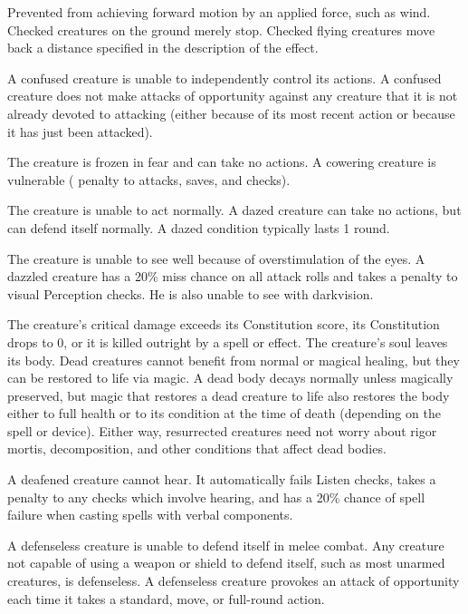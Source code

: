  Prevented from achieving forward motion by an applied force, such as wind. Checked creatures on the ground merely stop. Checked flying creatures move back a distance specified in the description of the effect.

\label{Confused} A confused creature is unable to independently control its actions. \confusionexplanation A confused creature does not make attacks of opportunity against any creature that it is not already devoted to attacking (either because of its most recent action or because it has just been attacked).

 The creature is frozen in fear and can take no actions. A cowering creature is vulnerable ( penalty to attacks, saves, and checks).

 The creature is unable to act normally. A dazed creature can take no actions, but can defend itself normally. A dazed condition typically lasts 1 round.

 The creature is unable to see well because of overstimulation of the eyes. A dazzled creature has a 20\% miss chance on all attack rolls and takes a  penalty to visual Perception checks. He is also unable to see with darkvision.

 The creature's critical damage exceeds its Constitution score, its Constitution drops to 0, or it is killed outright by a spell or effect. The creature's soul leaves its body. Dead creatures cannot benefit from normal or magical healing, but they can be restored to life via magic. A dead body decays normally unless magically preserved, but magic that restores a dead creature to life also restores the body either to full health or to its condition at the time of death (depending on the spell or device). Either way, resurrected creatures need not worry about rigor mortis, decomposition, and other conditions that affect dead bodies.

 A deafened creature cannot hear. It automatically fails Listen checks, takes a  penalty to any checks which involve hearing, and has a 20\% chance of spell failure when casting spells with verbal components.

 A defenseless creature is unable to defend itself in melee combat. Any creature not capable of using a weapon or shield to defend itself, such as most unarmed creatures, is defenseless. A defenseless creature provokes an attack of opportunity each time it takes a standard, move, or full-round action.

